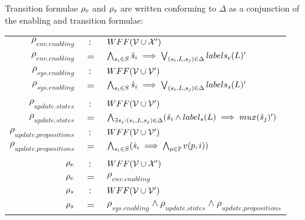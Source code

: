 Transition formulae ${\rho_e}$ and ${\rho_s}$ are written conforming to $\Delta$ as a conjunction of the enabling and transition formulae:

\vspace{1em}
\begin{tabular}{ r c l }
	$\rho_{env.enabling}$&$:$&$WFF({\mathcal{V}} \cup {\ensuremath{\mathcal{X}}}')$\\
	$\rho_{env.enabling}$ &$=$& $\bigwedge_{s_i \in S} \hat{s}_{i} \implies \bigvee_{(s_i,L,s_j) \in \Delta}labels_e(L)'$\\
	$\rho_{sys.enabling}$&$:$&$WFF({\mathcal{V}} \cup {\ensuremath{\mathcal{V}}}')$\\
	$\rho_{sys.enabling}$ &$=$& $\bigwedge_{s_i \in S} \hat{s}_{i} \implies \bigvee_{(s_i,L,s_j) \in \Delta}labels_s(L)'$\\
	&&\\
	$\rho_{update.states}$&$:$&$WFF({\mathcal{V}} \cup {\ensuremath{\mathcal{V}}}')$\\
$\rho_{update.states}$&$=$&$\bigwedge_{\exists s_j:(s_i,L,s_j) \in \Delta} (\hat{s}_{i} \wedge label_s(L) \implies mux(\hat{s}_{j})' ) $\\	
	$\rho_{update.propositions}$&$:$&$WFF({\mathcal{V}} \cup {\ensuremath{\mathcal{V}}}')$\\
	$\rho_{update.propositions}$&$=$&$\bigwedge_{s_i \in S} (\hat{s}_{i} \implies \bigwedge_{p \in \mathbb{P}}v(p,i) )$\\
	&&\\
	${\rho_e}$&$:$&$WFF({\mathcal{V}} \cup {\ensuremath{\mathcal{X}}}')$\\
	${\rho_e}$&$=$&$\rho_{env.enabling}$\\		
	${\rho_s}$&$:$&$WFF({\mathcal{V}} \cup {\ensuremath{\mathcal{V}}}')$\\	
	${\rho_s}$&$=$&$\rho_{sys.enabling} \wedge  \rho_{update.states} \wedge  \rho_{update.propositions}$\\	
\end{tabular}
\vspace{1em}

